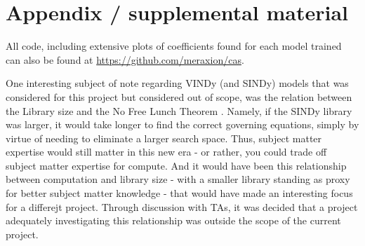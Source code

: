 \documentclass{article}
\begin{document}
\printbibliography{}

\appendix

\section{Appendix / supplemental material}
\label{appendix}

All code, including extensive plots of coefficients found for each model trained can also be found at \url{https://github.com/meraxion/cas}.

One interesting subject of note regarding VINDy (and SINDy) models that was considered for this project but considered out of scope, was the relation between the Library size and the No Free Lunch Theorem \citep{wolpertNoFreeLunch1997}. Namely, if the SINDy library was larger, it would take longer to find the correct governing equations, simply by virtue of needing to eliminate a larger search space. Thus, subject matter expertise would still matter in this new era - or rather, you could trade off subject matter expertise for compute. And it would have been this relationship between computation and library size - with a smaller library standing as proxy for better subject matter knowledge - that would have made an interesting focus for a differejt project. Through discussion with TAs, it was decided that a project adequately investigating this relationship was outside the scope of the current project.
\end{document}
